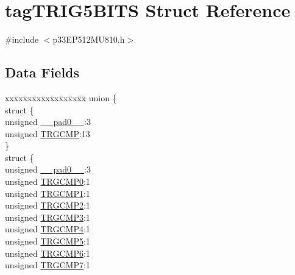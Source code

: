 \hypertarget{structtag_t_r_i_g5_b_i_t_s}{}\section{tag\+T\+R\+I\+G5\+B\+I\+TS Struct Reference}
\label{structtag_t_r_i_g5_b_i_t_s}


{\ttfamily \#include $<$p33\+E\+P512\+M\+U810.\+h$>$}

\subsection*{Data Fields}
\begin{DoxyCompactItemize}
\item 
\begin{tabbing}
xx\=xx\=xx\=xx\=xx\=xx\=xx\=xx\=xx\=\kill
union \{\\
\>struct \{\\
\>\>unsigned \hyperlink{structtag_t_r_i_g5_b_i_t_s_adf71f3d8410c1f1dbbc96680a92c49af}{\_\_pad0\_\_}:3\\
\>\>unsigned \hyperlink{structtag_t_r_i_g5_b_i_t_s_aceafdcd310f8a6833f64c9d20ec5567e}{TRGCMP}:13\\
\>\} \\
\>struct \{\\
\>\>unsigned \hyperlink{structtag_t_r_i_g5_b_i_t_s_adf71f3d8410c1f1dbbc96680a92c49af}{\_\_pad0\_\_}:3\\
\>\>unsigned \hyperlink{structtag_t_r_i_g5_b_i_t_s_a592102a5d0362674b8b287b5f8dd9f2a}{TRGCMP0}:1\\
\>\>unsigned \hyperlink{structtag_t_r_i_g5_b_i_t_s_ab2a016c04074d53199dbd32df07c6d09}{TRGCMP1}:1\\
\>\>unsigned \hyperlink{structtag_t_r_i_g5_b_i_t_s_a1fd283d3a2f1005e0d597b4e61399485}{TRGCMP2}:1\\
\>\>unsigned \hyperlink{structtag_t_r_i_g5_b_i_t_s_a823f89a0ad77efa6c3c8d01c3932f03e}{TRGCMP3}:1\\
\>\>unsigned \hyperlink{structtag_t_r_i_g5_b_i_t_s_a2bf01f968c2bba2453f76d1590c70490}{TRGCMP4}:1\\
\>\>unsigned \hyperlink{structtag_t_r_i_g5_b_i_t_s_a6dc78e81c5a3e6993b4558dff9657ee2}{TRGCMP5}:1\\
\>\>unsigned \hyperlink{structtag_t_r_i_g5_b_i_t_s_a9ba81e821299317a829e795392b93beb}{TRGCMP6}:1\\
\>\>unsigned \hyperlink{structtag_t_r_i_g5_b_i_t_s_aa801131b5ab0b542a360d202275ea4fd}{TRGCMP7}:1\\

\end{tabbing}
\end{DoxyCompactItemize}
